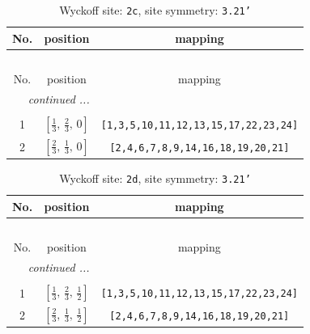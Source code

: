 \documentclass[fleqn,8pt]{jsarticle}
\begin{document}
\begin{longtable}{ccc}
\caption{Wyckoff site: {\tt 2c}, site symmetry: {\tt 3.21'}}
 \\
 \hline \hline
No. & position & mapping \\ \hline \endfirsthead

\multicolumn{2}{l}{\tablename\ \thetable{}} \\
 \hline \hline
No. & position & mapping \\ \hline \endhead

 \hline \hline
\multicolumn{2}{r}{\footnotesize\it continued ...} \\ \endfoot

 \hline \hline
\multicolumn{2}{r}{} \\ \endlastfoot

1 & $\left[ \frac{1}{3},\, \frac{2}{3},\, 0 \right]$ & {\tt [1,3,5,10,11,12,13,15,17,22,23,24]} \\ \hline
2 & $\left[ \frac{2}{3},\, \frac{1}{3},\, 0 \right]$ & {\tt [2,4,6,7,8,9,14,16,18,19,20,21]} \\
\end{longtable}
\renewcommand{\arraystretch}{1.2}
\begin{longtable}{ccc}
\caption{Wyckoff site: {\tt 2d}, site symmetry: {\tt 3.21'}}
 \\
 \hline \hline
No. & position & mapping \\ \hline \endfirsthead

\multicolumn{2}{l}{\tablename\ \thetable{}} \\
 \hline \hline
No. & position & mapping \\ \hline \endhead

 \hline \hline
\multicolumn{2}{r}{\footnotesize\it continued ...} \\ \endfoot

 \hline \hline
\multicolumn{2}{r}{} \\ \endlastfoot

1 & $\left[ \frac{1}{3},\, \frac{2}{3},\, \frac{1}{2} \right]$ & {\tt [1,3,5,10,11,12,13,15,17,22,23,24]} \\ \hline
2 & $\left[ \frac{2}{3},\, \frac{1}{3},\, \frac{1}{2} \right]$ & {\tt [2,4,6,7,8,9,14,16,18,19,20,21]} \\
\end{longtable}
\renewcommand{\arraystretch}{1.2}
\end{document}
